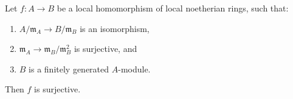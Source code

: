 Let $f: A \rightarrow B$ be a local homomorphism of local noetherian rings, such that:
\begin{enumerate}
\item[(1)] $A/\mathfrak{m}_A \rightarrow B/\mathfrak{m}_B$ is an isomorphism,
\item[(2)] $\mathfrak{m}_A \rightarrow \mathfrak{m}_B/\mathfrak{m}_B^2$ is surjective, and
\item[(3)] $B$ is a finitely generated $A$-module.
\end{enumerate}
Then $f$ is surjective.
